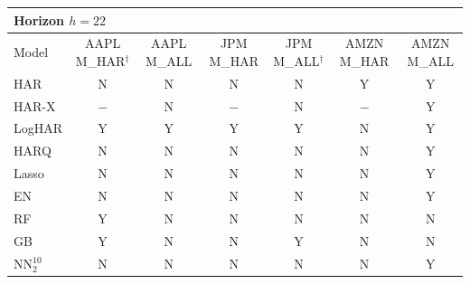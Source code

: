 \begin{tabular}{l cccccc}
\toprule
\multicolumn{7}{l}{\textbf{Horizon $h=22$}} \\
\midrule
Model & AAPL M\_HAR$^\dagger$ & AAPL M\_ALL & JPM M\_HAR & JPM M\_ALL$^\dagger$ & AMZN M\_HAR & AMZN M\_ALL \\
\midrule
HAR & N & N & N & N & Y & Y \\
HAR-X & $-$ & N & $-$ & N & $-$ & Y \\
LogHAR & Y & Y & Y & Y & N & Y \\
HARQ & N & N & N & N & N & Y \\
Lasso & N & N & N & N & N & Y \\
EN & N & N & N & N & N & Y \\
RF & Y & N & N & N & N & N \\
GB & Y & N & N & Y & N & N \\
NN$_2^{10}$ & N & N & N & N & N & Y \\
\bottomrule
\end{tabular}
\vspace{1em}

